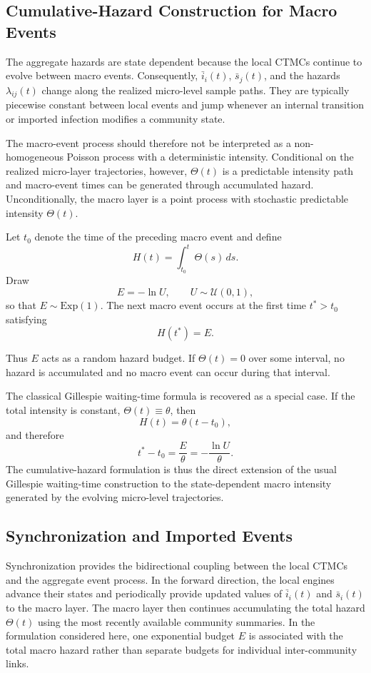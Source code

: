 \documentclass[a4paper,fleqn]{cas-sc}
\begin{document}
\subsection{Cumulative-Hazard Construction for Macro Events}

The aggregate hazards are state dependent because the local CTMCs continue to evolve between macro events. Consequently, $\bar{i}_i(t)$, $\bar{s}_j(t)$, and the hazards $\lambda_{ij}(t)$ change along the realized micro-level sample paths. They are typically piecewise constant between local events and jump whenever an internal transition or imported infection modifies a community state.

The macro-event process should therefore not be interpreted as a non-homogeneous Poisson process with a deterministic intensity. Conditional on the realized micro-layer trajectories, however, $\Theta(t)$ is a predictable intensity path and macro-event times can be generated through accumulated hazard. Unconditionally, the macro layer is a point process with stochastic predictable intensity $\Theta(t)$.

Let $t_0$ denote the time of the preceding macro event and define
\[
H(t)
=
\int_{t_0}^{t}
\Theta(s)\,ds.
\]
Draw
\[
E=-\ln U,
\qquad
U\sim\mathcal{U}(0,1),
\]
so that $E\sim\mathrm{Exp}(1)$. The next macro event occurs at the first time $t^\ast>t_0$ satisfying
\[
H(t^\ast)=E.
\]

Thus $E$ acts as a random hazard budget. If $\Theta(t)=0$ over some interval, no hazard is accumulated and no macro event can occur during that interval.

The classical Gillespie waiting-time formula is recovered as a special case. If the total intensity is constant, $\Theta(t)\equiv\theta$, then
\[
H(t)
=
\theta(t-t_0),
\]
and therefore
\[
t^\ast-t_0
=
\frac{E}{\theta}
=
-\frac{\ln U}{\theta}.
\]
The cumulative-hazard formulation is thus the direct extension of the usual Gillespie waiting-time construction to the state-dependent macro intensity generated by the evolving micro-level trajectories.


\subsection{Synchronization and Imported Events}

Synchronization provides the bidirectional coupling between the local CTMCs and the aggregate event process. In the forward direction, the local engines advance their states and periodically provide updated values of $\bar{i}_i(t)$ and $\bar{s}_i(t)$ to the macro layer. The macro layer then continues accumulating the total hazard $\Theta(t)$ using the most recently available community summaries. In the formulation considered here, one exponential budget $E$ is associated with the total macro hazard rather than separate budgets for individual inter-community links.
\end{document}
